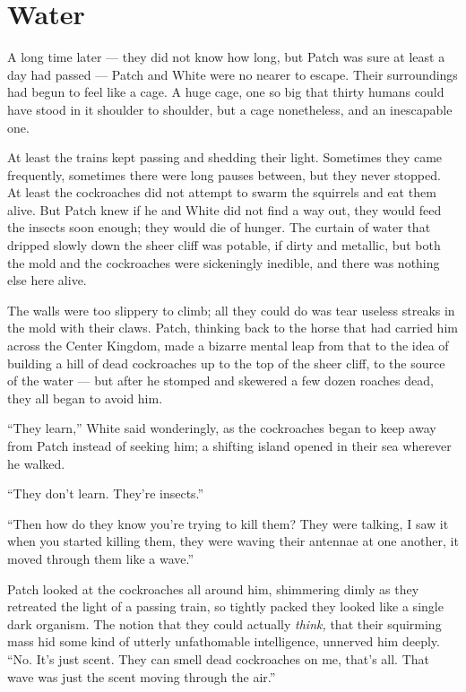 \documentclass[ebook,oneside,openany,12pt]{memoir}
\begin{document}

\section{Water}

A long time later — they did not know how long, but Patch was sure at
least a day had passed — Patch and White were no nearer to
escape. Their surroundings had begun to feel like a cage. A huge cage,
one so big that thirty humans could have stood in it shoulder to
shoulder, but a cage nonetheless, and an inescapable one.

At least the trains kept passing and shedding their light. Sometimes
they came frequently, sometimes there were long pauses between, but
they never stopped. At least the cockroaches did not attempt to swarm
the squirrels and eat them alive. But Patch knew if he and White did
not find a way out, they would feed the insects soon enough; they
would die of hunger. The curtain of water that dripped slowly down the
sheer cliff was potable, if dirty and metallic, but both the mold and
the cockroaches were sickeningly inedible, and there was nothing else
here alive.

The walls were too slippery to climb; all they could do was tear
useless streaks in the mold with their claws. Patch, thinking back to
the horse that had carried him across the Center Kingdom, made a
bizarre mental leap from that to the idea of building a hill of dead
cockroaches up to the top of the sheer cliff, to the source of the
water — but after he stomped and skewered a few dozen roaches dead,
they all began to avoid him.

“They learn,” White said wonderingly, as the cockroaches began to keep
away from Patch instead of seeking him; a shifting island opened in
their sea wherever he walked.

“They don’t learn. They’re insects.”

“Then how do they know you’re trying to kill them? They were talking,
I saw it when you started killing them, they were waving their
antennae at one another, it moved through them like a wave.”

Patch looked at the cockroaches all around him, shimmering dimly as
they retreated the light of a passing train, so tightly packed they
looked like a single dark organism. The notion that they could
actually \emph{think,} that their squirming mass hid some kind of
utterly unfathomable intelligence, unnerved him deeply. “No. It’s just
scent. They can smell dead cockroaches on me, that’s all. That wave
was just the scent moving through the air.”
\end{document}
